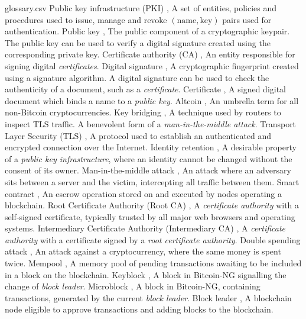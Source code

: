 \newcommand{\comma}[0]{, }

\begin{filecontents*}{glossary.csv}
Public key infrastructure (PKI)   , A set of entities\comma policies and procedures used to issue\comma manage and revoke $(\text{name}\comma \text{key})$ pairs used for authentication.
Public key                        , The public component of a cryptographic keypair. The public key can be used to verify a digital signature created using the corresponding private key.
Certificate authority (CA)        , An entity responsible for signing digital \emph{certificates}.
Digital signature                 , A cryptographic fingerprint created using a signature algorithm. A digital signature can be used to check the authenticity of a document\comma such as a \emph{certificate}.
Certificate                       , A signed digital document which binds a name to a \emph{public key}.
Altcoin                           , An umbrella term for all non-Bitcoin cryptocurrencies.
Key bridging                      , A technique used by routers to inspect TLS traffic. A benevolent form of a \emph{man-in-the-middle attack}.
Transport Layer Security (TLS)    , A protocol used to establish an authenticated and encrypted connection over the Internet.
Identity retention                , A desirable property of a \emph{public key infrastructure}\comma where an identity cannot be changed without the consent of its owner.
Man-in-the-middle attack          , An attack where an adversary sits between a server and the victim\comma intercepting all traffic between them.
Smart contract                    , An escrow operation stored on and executed by nodes operating a blockchain.
Root Certificate Authority (Root CA) , A \emph{certificate authority} with a self-signed certificate\comma typically trusted by all major web browsers and operating systems.
Intermediary Certificate Authority (Intermediary CA) , A \emph{certificate authority} with a certificate signed by a \emph{root certificate authority}.
Double spending attack            , An attack against a cryptocurrency\comma where the same money is spent twice.
Mempool                           , A memory pool of pending transactions awaiting to be included in a block on the blockchain.
Keyblock                          , A block in Bitcoin-NG signalling the change of \emph{block leader}.
Microblock                        , A block in Bitcoin-NG\comma containing transactions\comma generated by the current \emph{block leader}.
Block leader                      , A blockchain node eligible to approve transactions and adding blocks to the blockchain.

\end{filecontents*}
